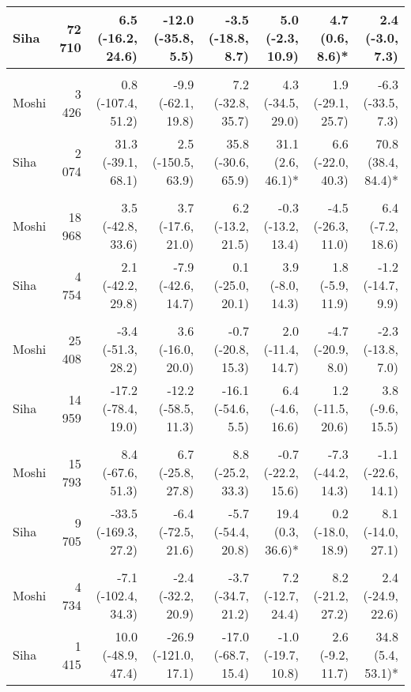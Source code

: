 \begin{table}[t]
\begin{tabular*}{\linewidth}{@{\extracolsep{\fill}}l|rrrrrrr}
Siha & 72 710 & 6.5 (-16.2, 24.6)  & -12.0 (-35.8, 5.5)  & -3.5 (-18.8, 8.7)  & 5.0 (-2.3, 10.9)  & 4.7 (0.6, 8.6)* & 2.4 (-3.0, 7.3)  \\ 
\midrule\addlinespace[2.5pt]
\multicolumn{8}{l}{Neoplasms/Cancer} \\[2.5pt] 
\midrule\addlinespace[2.5pt]
Moshi & 3 426 & 0.8 (-107.4, 51.2)  & -9.9 (-62.1, 19.8)  & 7.2 (-32.8, 35.7)  & 4.3 (-34.5, 29.0)  & 1.9 (-29.1, 25.7)  & -6.3 (-33.5, 7.3)  \\ 
Siha & 2 074 & 31.3 (-39.1, 68.1)  & 2.5 (-150.5, 63.9)  & 35.8 (-30.6, 65.9)  & 31.1 (2.6, 46.1)* & 6.6 (-22.0, 40.3)  & 70.8 (38.4, 84.4)* \\ 
\midrule\addlinespace[2.5pt]
\multicolumn{8}{l}{Other Cardiovascular Diseases} \\[2.5pt] 
\midrule\addlinespace[2.5pt]
Moshi & 18 968 & 3.5 (-42.8, 33.6)  & 3.7 (-17.6, 21.0)  & 6.2 (-13.2, 21.5)  & -0.3 (-13.2, 13.4)  & -4.5 (-26.3, 11.0)  & 6.4 (-7.2, 18.6)  \\ 
Siha & 4 754 & 2.1 (-42.2, 29.8)  & -7.9 (-42.6, 14.7)  & 0.1 (-25.0, 20.1)  & 3.9 (-8.0, 14.3)  & 1.8 (-5.9, 11.9)  & -1.2 (-14.7, 9.9)  \\ 
\midrule\addlinespace[2.5pt]
\multicolumn{8}{l}{Mild/Moderate Anemia} \\[2.5pt] 
\midrule\addlinespace[2.5pt]
Moshi & 25 408 & -3.4 (-51.3, 28.2)  & 3.6 (-16.0, 20.0)  & -0.7 (-20.8, 15.3)  & 2.0 (-11.4, 14.7)  & -4.7 (-20.9, 8.0)  & -2.3 (-13.8, 7.0)  \\ 
Siha & 14 959 & -17.2 (-78.4, 19.0)  & -12.2 (-58.5, 11.3)  & -16.1 (-54.6, 5.5)  & 6.4 (-4.6, 16.6)  & 1.2 (-11.5, 20.6)  & 3.8 (-9.6, 15.5)  \\ 
\midrule\addlinespace[2.5pt]
\multicolumn{8}{l}{Caries} \\[2.5pt] 
\midrule\addlinespace[2.5pt]
Moshi & 15 793 & 8.4 (-67.6, 51.3)  & 6.7 (-25.8, 27.8)  & 8.8 (-25.2, 33.3)  & -0.7 (-22.2, 15.6)  & -7.3 (-44.2, 14.3)  & -1.1 (-22.6, 14.1)  \\ 
Siha & 9 705 & -33.5 (-169.3, 27.2)  & -6.4 (-72.5, 21.6)  & -5.7 (-54.4, 20.8)  & 19.4 (0.3, 36.6)* & 0.2 (-18.0, 18.9)  & 8.1 (-14.0, 27.1)  \\ 
\midrule\addlinespace[2.5pt]
\multicolumn{8}{l}{Poisoning} \\[2.5pt] 
\midrule\addlinespace[2.5pt]
Moshi & 4 734 & -7.1 (-102.4, 34.3)  & -2.4 (-32.2, 20.9)  & -3.7 (-34.7, 21.2)  & 7.2 (-12.7, 24.4)  & 8.2 (-21.2, 27.2)  & 2.4 (-24.9, 22.6)  \\ 
Siha & 1 415 & 10.0 (-48.9, 47.4)  & -26.9 (-121.0, 17.1)  & -17.0 (-68.7, 15.4)  & -1.0 (-19.7, 10.8)  & 2.6 (-9.2, 11.7)  & 34.8 (5.4, 53.1)* \\ 

\end{tabular*}
\end{table}
